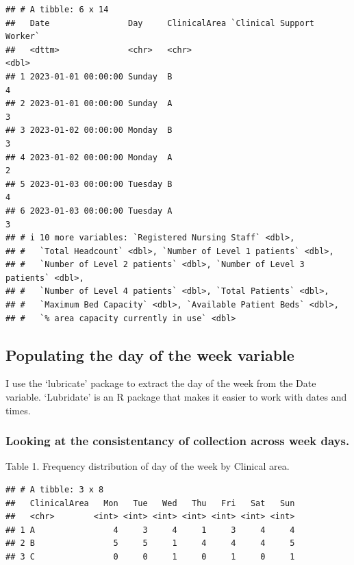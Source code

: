 \documentclass[
]{article}
\begin{document}
\begin{verbatim}
## # A tibble: 6 x 14
##   Date                Day     ClinicalArea `Clinical Support Worker`
##   <dttm>              <chr>   <chr>                            <dbl>
## 1 2023-01-01 00:00:00 Sunday  B                                    4
## 2 2023-01-01 00:00:00 Sunday  A                                    3
## 3 2023-01-02 00:00:00 Monday  B                                    3
## 4 2023-01-02 00:00:00 Monday  A                                    2
## 5 2023-01-03 00:00:00 Tuesday B                                    4
## 6 2023-01-03 00:00:00 Tuesday A                                    3
## # i 10 more variables: `Registered Nursing Staff` <dbl>,
## #   `Total Headcount` <dbl>, `Number of Level 1 patients` <dbl>,
## #   `Number of Level 2 patients` <dbl>, `Number of Level 3 patients` <dbl>,
## #   `Number of Level 4 patients` <dbl>, `Total Patients` <dbl>,
## #   `Maximum Bed Capacity` <dbl>, `Available Patient Beds` <dbl>,
## #   `% area capacity currently in use` <dbl>
\end{verbatim}

\hypertarget{populating-the-day-of-the-week-variable}{%
\subsection{Populating the day of the week
variable}\label{populating-the-day-of-the-week-variable}}

I use the `lubricate' package to extract the day of the week from the
Date variable. `Lubridate' is an R package that makes it easier to work
with dates and times.

\hypertarget{looking-at-the-consistentancy-of-collection-across-week-days.}{%
\subsubsection{Looking at the consistentancy of collection across week
days.}\label{looking-at-the-consistentancy-of-collection-across-week-days.}}

Table 1. Frequency distribution of day of the week by Clinical area.

\begin{verbatim}
## # A tibble: 3 x 8
##   ClinicalArea   Mon   Tue   Wed   Thu   Fri   Sat   Sun
##   <chr>        <int> <int> <int> <int> <int> <int> <int>
## 1 A                4     3     4     1     3     4     4
## 2 B                5     5     1     4     4     4     5
## 3 C                0     0     1     0     1     0     1
\end{verbatim}
\end{document}
